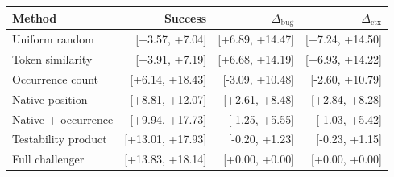\begin{tabular}{lrrr}
\toprule
Method & Success & $\Delta_{\mathrm{bug}}$ & $\Delta_{\mathrm{ctx}}$ \\
\midrule
Uniform random & [+3.57, +7.04] & [+6.89, +14.47] & [+7.24, +14.50] \\
Token similarity & [+3.91, +7.19] & [+6.68, +14.19] & [+6.93, +14.22] \\
Occurrence count & [+6.14, +18.43] & [-3.09, +10.48] & [-2.60, +10.79] \\
Native position & [+8.81, +12.07] & [+2.61, +8.48] & [+2.84, +8.28] \\
Native + occurrence & [+9.94, +17.73] & [-1.25, +5.55] & [-1.03, +5.42] \\
Testability product & [+13.01, +17.93] & [-0.20, +1.23] & [-0.23, +1.15] \\
Full challenger & [+13.83, +18.14] & [+0.00, +0.00] & [+0.00, +0.00] \\
\bottomrule
\end{tabular}
